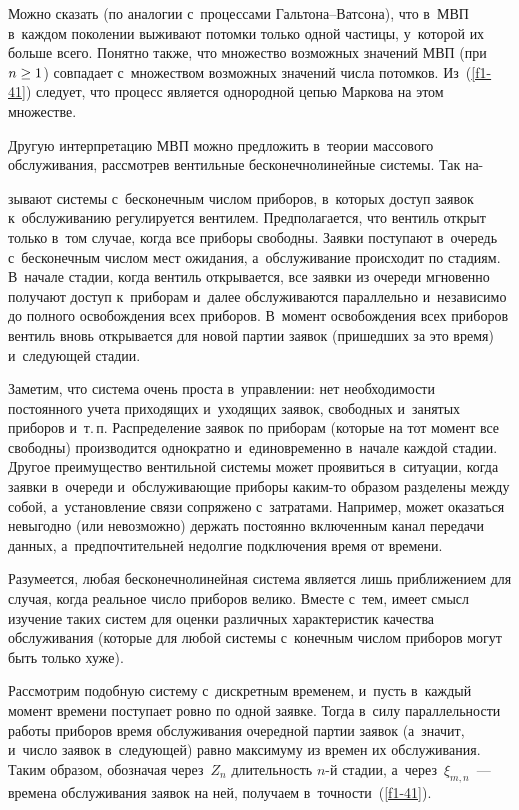 \begin{multicols}{2}
Можно сказать (по аналогии с~процессами Галь\-то\-на--Ват\-со\-на), что 
в~МВП в~каж\-дом поколении выживают потомки
только одной час\-ти\-цы, у~которой их больше всего. Понятно так\-же, что
множество воз\-мож\-ных значений МВП (при $n\hm\ge 1$)
совпадает с~множеством воз\-мож\-ных значений чис\-ла потомков.
Из~(\ref{f1-41}) следует, что процесс является однородной цепью Маркова
на этом множестве.

Другую интерпретацию МВП можно предложить в~тео\-рии массового
обслуживания, рас\-смот\-рев вентильные бесконечнолинейные сис\-те\-мы.
Так на-\linebreak\vspace*{-12pt}

\pagebreak

\noindent
зывают сис\-те\-мы 
с~бесконечным чис\-лом приборов, в~которых доступ заявок к~обслуживанию
регулируется вентилем. Предполагается, что вентиль открыт только
в~том случае, когда все приборы свободны. Заявки по\-сту\-па\-ют в~очередь
с~бесконечным числом мест ожидания, а~обслуживание происходит по стадиям.
В~начале стадии, когда вентиль открывается, все заявки из очереди
мгновенно получают доступ к~приборам и~далее обслуживаются параллельно
и~независимо до полного осво\-бож\-де\-ния всех приборов.
В~момент освобождения всех приборов вентиль вновь открывается для новой
пар\-тии заявок (пришедших за это время) и~сле\-ду\-ющей стадии.


Заметим, что
система очень проста в~управлении: нет не\-об\-хо\-ди\-мости постоянного учета
приходящих и~уходящих заявок, свободных и~занятых приборов и~т.\,п.
Распределение заявок по приборам (которые на тот момент все свободны)
производится однократно и~единовременно в~начале каждой стадии.
Другое преимущество вентильной сис\-те\-мы может проявиться в~ситуации,
когда заявки в~очереди и~об\-слу\-жи\-ва\-ющие приборы ка\-ким-то образом
разделены между собой, а~установление связи сопряжено с~затратами.
Например, может оказаться невыгодно (или не\-воз\-мож\-но) держать постоянно
вклю\-чен\-ным канал передачи данных, а~предпочтительней недолгие
под\-клю\-че\-ния время от времени.

Разумеется, любая бесконечнолинейная сис\-те\-ма является лишь
приближением для случая, когда реальное чис\-ло приборов велико.
Вместе с~тем, имеет смысл изучение таких сис\-тем для оценки различных
характеристик качества обслуживания (которые для любой сис\-те\-мы
с~конечным числом приборов могут быть только хуже).

Рассмотрим подобную сис\-те\-му с~диск\-рет\-ным временем, и~пусть в~каж\-дый
момент времени по\-сту\-па\-ет ров\-но по одной заявке. Тогда
в~силу па\-рал\-лель\-ности работы приборов время обслуживания очередной
пар\-тии заявок (а~значит, и~чис\-ло заявок в~сле\-ду\-ющей) равно
максимуму из времен их обслуживания. Таким образом, обозначая
через~$Z_n$ дли\-тель\-ность $n$-й стадии, а~через~$\xi_{m,n}$~---
времена обслуживания заявок на ней, получаем в~точ\-ности~(\ref{f1-41}).


\end{multicols}
